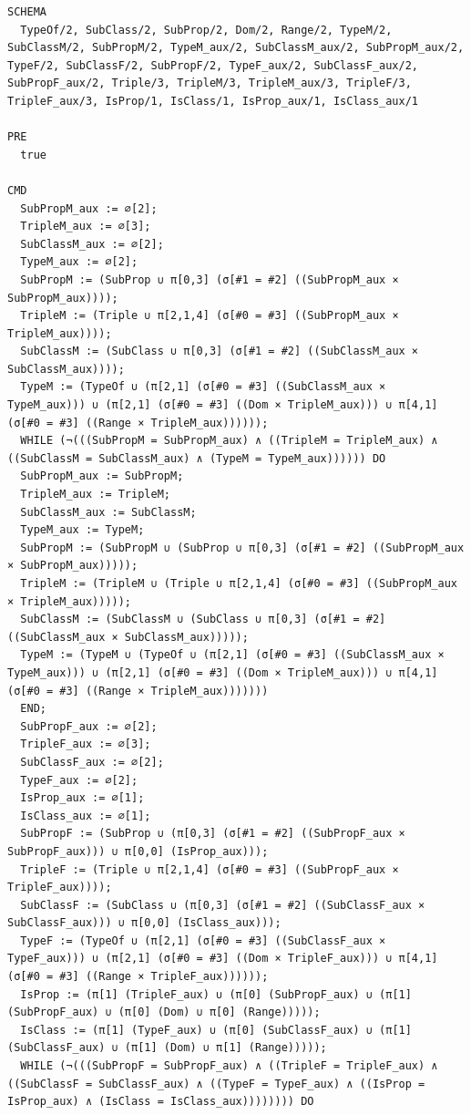 \documentclass[10pt]{article}
\begin{document}
\begin{Verbatim}[fontsize=\tiny,breaklines=true,breakanywhere=true,frame=single,framesep=1.5mm]
SCHEMA
  TypeOf/2, SubClass/2, SubProp/2, Dom/2, Range/2, TypeM/2, SubClassM/2, SubPropM/2, TypeM_aux/2, SubClassM_aux/2, SubPropM_aux/2, TypeF/2, SubClassF/2, SubPropF/2, TypeF_aux/2, SubClassF_aux/2, SubPropF_aux/2, Triple/3, TripleM/3, TripleM_aux/3, TripleF/3, TripleF_aux/3, IsProp/1, IsClass/1, IsProp_aux/1, IsClass_aux/1

PRE
  true 

CMD
  SubPropM_aux := ∅[2];
  TripleM_aux := ∅[3];
  SubClassM_aux := ∅[2];
  TypeM_aux := ∅[2];
  SubPropM := (SubProp ∪ π[0,3] (σ[#1 = #2] ((SubPropM_aux × SubPropM_aux))));
  TripleM := (Triple ∪ π[2,1,4] (σ[#0 = #3] ((SubPropM_aux × TripleM_aux))));
  SubClassM := (SubClass ∪ π[0,3] (σ[#1 = #2] ((SubClassM_aux × SubClassM_aux))));
  TypeM := (TypeOf ∪ (π[2,1] (σ[#0 = #3] ((SubClassM_aux × TypeM_aux))) ∪ (π[2,1] (σ[#0 = #3] ((Dom × TripleM_aux))) ∪ π[4,1] (σ[#0 = #3] ((Range × TripleM_aux))))));
  WHILE (¬(((SubPropM = SubPropM_aux) ∧ ((TripleM = TripleM_aux) ∧ ((SubClassM = SubClassM_aux) ∧ (TypeM = TypeM_aux)))))) DO
  SubPropM_aux := SubPropM;
  TripleM_aux := TripleM;
  SubClassM_aux := SubClassM;
  TypeM_aux := TypeM;
  SubPropM := (SubPropM ∪ (SubProp ∪ π[0,3] (σ[#1 = #2] ((SubPropM_aux × SubPropM_aux)))));
  TripleM := (TripleM ∪ (Triple ∪ π[2,1,4] (σ[#0 = #3] ((SubPropM_aux × TripleM_aux)))));
  SubClassM := (SubClassM ∪ (SubClass ∪ π[0,3] (σ[#1 = #2] ((SubClassM_aux × SubClassM_aux)))));
  TypeM := (TypeM ∪ (TypeOf ∪ (π[2,1] (σ[#0 = #3] ((SubClassM_aux × TypeM_aux))) ∪ (π[2,1] (σ[#0 = #3] ((Dom × TripleM_aux))) ∪ π[4,1] (σ[#0 = #3] ((Range × TripleM_aux)))))))
  END;
  SubPropF_aux := ∅[2];
  TripleF_aux := ∅[3];
  SubClassF_aux := ∅[2];
  TypeF_aux := ∅[2];
  IsProp_aux := ∅[1];
  IsClass_aux := ∅[1];
  SubPropF := (SubProp ∪ (π[0,3] (σ[#1 = #2] ((SubPropF_aux × SubPropF_aux))) ∪ π[0,0] (IsProp_aux)));
  TripleF := (Triple ∪ π[2,1,4] (σ[#0 = #3] ((SubPropF_aux × TripleF_aux))));
  SubClassF := (SubClass ∪ (π[0,3] (σ[#1 = #2] ((SubClassF_aux × SubClassF_aux))) ∪ π[0,0] (IsClass_aux)));
  TypeF := (TypeOf ∪ (π[2,1] (σ[#0 = #3] ((SubClassF_aux × TypeF_aux))) ∪ (π[2,1] (σ[#0 = #3] ((Dom × TripleF_aux))) ∪ π[4,1] (σ[#0 = #3] ((Range × TripleF_aux))))));
  IsProp := (π[1] (TripleF_aux) ∪ (π[0] (SubPropF_aux) ∪ (π[1] (SubPropF_aux) ∪ (π[0] (Dom) ∪ π[0] (Range)))));
  IsClass := (π[1] (TypeF_aux) ∪ (π[0] (SubClassF_aux) ∪ (π[1] (SubClassF_aux) ∪ (π[1] (Dom) ∪ π[1] (Range)))));
  WHILE (¬(((SubPropF = SubPropF_aux) ∧ ((TripleF = TripleF_aux) ∧ ((SubClassF = SubClassF_aux) ∧ ((TypeF = TypeF_aux) ∧ ((IsProp = IsProp_aux) ∧ (IsClass = IsClass_aux)))))))) DO

\end{Verbatim}
\end{document}
